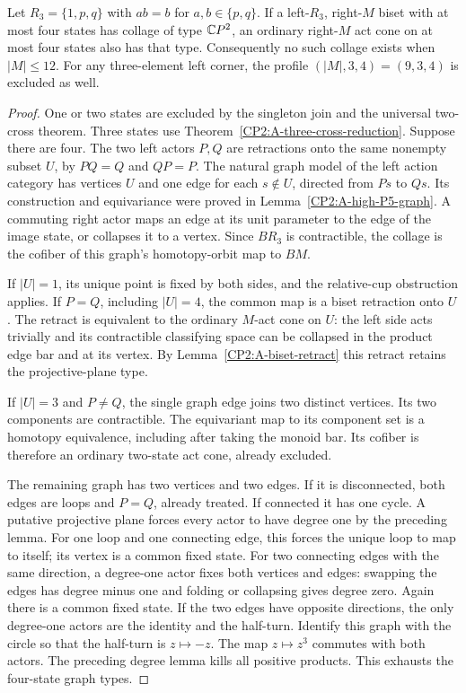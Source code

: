\begin{proposition}
\label{CP2:A-right-zero-four-states}
Let $R_3=\{1,p,q\}$ with $ab=b$ for $a,b\in\{p,q\}$.
If a left-$R_3$, right-$M$ biset with at most four states
has collage of type $\mathbb{C}P^2$, an ordinary right-$M$ act
cone on at most four states also has that type.
Consequently no such collage exists when $|M|\leq12$.
For any three-element left corner, the profile
$(|M|,3,4)=(9,3,4)$ is excluded as well.
\end{proposition}
\begin{proof}
One or two states are excluded by the singleton join and
the universal two-cross theorem. Three states use
Theorem~\ref{CP2:A-three-cross-reduction}. Suppose there
are four. The two left actors $P,Q$ are retractions onto
the same nonempty subset $U$, by $PQ=Q$ and $QP=P$.
The natural graph model of the left action category has
vertices $U$ and one edge for each $s\notin U$, directed
from $Ps$ to $Qs$. Its construction and equivariance were
proved in Lemma~\ref{CP2:A-high-P5-graph}. A commuting
right actor maps an edge at its unit parameter to the
edge of the image state, or collapses it to a vertex.
Since $BR_3$ is contractible, the collage is the cofiber
of this graph's homotopy-orbit map to $BM$.

If $|U|=1$, its unique point is fixed by both sides,
and the relative-cup obstruction applies. If $P=Q$,
including $|U|=4$, the common map is a biset retraction
onto $U$. The retract is equivalent to the ordinary
$M$-act cone on $U$: the left side acts trivially and
its contractible classifying space can be collapsed
in the product edge bar and at its vertex. By
Lemma~\ref{CP2:A-biset-retract} this retract retains
the projective-plane type.

If $|U|=3$ and $P\ne Q$, the single graph edge joins
two distinct vertices. Its two components are
contractible. The equivariant map to its component
set is a homotopy equivalence, including after taking
the monoid bar. Its cofiber is therefore an ordinary
two-state act cone, already excluded.

The remaining graph has two vertices and two edges.
If it is disconnected, both edges are loops and
$P=Q$, already treated. If connected it has one
cycle. A putative projective plane forces every
actor to have degree one by the preceding lemma.
For one loop and one connecting edge, this forces
the unique loop to map to itself; its vertex is
a common fixed state. For two connecting edges
with the same direction, a degree-one actor fixes
both vertices and edges: swapping the edges has
degree minus one and folding or collapsing gives
degree zero. Again there is a common fixed state.
If the two edges have opposite directions, the
only degree-one actors are the identity and the
half-turn. Identify this graph with the circle
so that the half-turn is $z\mapsto-z$. The map
$z\mapsto z^3$ commutes with both actors. The
preceding degree lemma kills all positive products.
This exhausts the four-state graph types.


\end{proof}
